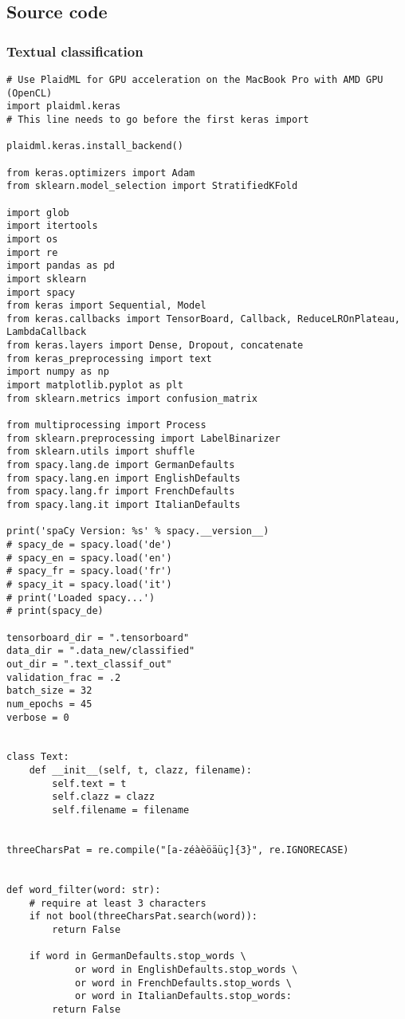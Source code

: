 \subsection{Source code}
\subsubsection{Textual classification}
\begin{verbatim}
# Use PlaidML for GPU acceleration on the MacBook Pro with AMD GPU (OpenCL)
import plaidml.keras
# This line needs to go before the first keras import

plaidml.keras.install_backend()

from keras.optimizers import Adam
from sklearn.model_selection import StratifiedKFold

import glob
import itertools
import os
import re
import pandas as pd
import sklearn
import spacy
from keras import Sequential, Model
from keras.callbacks import TensorBoard, Callback, ReduceLROnPlateau, LambdaCallback
from keras.layers import Dense, Dropout, concatenate
from keras_preprocessing import text
import numpy as np
import matplotlib.pyplot as plt
from sklearn.metrics import confusion_matrix

from multiprocessing import Process
from sklearn.preprocessing import LabelBinarizer
from sklearn.utils import shuffle
from spacy.lang.de import GermanDefaults
from spacy.lang.en import EnglishDefaults
from spacy.lang.fr import FrenchDefaults
from spacy.lang.it import ItalianDefaults

print('spaCy Version: %s' % spacy.__version__)
# spacy_de = spacy.load('de')
# spacy_en = spacy.load('en')
# spacy_fr = spacy.load('fr')
# spacy_it = spacy.load('it')
# print('Loaded spacy...')
# print(spacy_de)

tensorboard_dir = ".tensorboard"
data_dir = ".data_new/classified"
out_dir = ".text_classif_out"
validation_frac = .2
batch_size = 32
num_epochs = 45
verbose = 0


class Text:
    def __init__(self, t, clazz, filename):
        self.text = t
        self.clazz = clazz
        self.filename = filename


threeCharsPat = re.compile("[a-zéàèöäüç]{3}", re.IGNORECASE)


def word_filter(word: str):
    # require at least 3 characters
    if not bool(threeCharsPat.search(word)):
        return False

    if word in GermanDefaults.stop_words \
            or word in EnglishDefaults.stop_words \
            or word in FrenchDefaults.stop_words \
            or word in ItalianDefaults.stop_words:
        return False


\end{verbatim}
